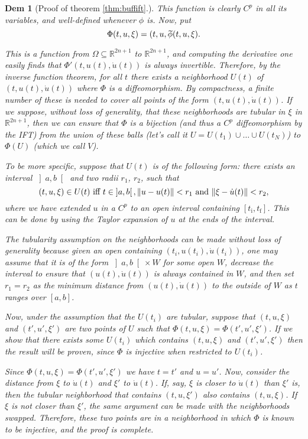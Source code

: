 \documentclass{article}
\theoremstyle{plain}
\theoremstyle{plain}
\theoremstyle{nonumberplain}
\theoremstyle{empty}
\newtheorem{proofref}{Dem}
\newcommand{\R}{\mathbb{R}}
\newcommand{\tstart}{\mathrm{i}}
\newcommand{\tend}{\mathrm{f}}
\newcommand{\wtphi}{
  \mspace{2mu}
  \widetilde{\mspace{-2mu}\smash[t]{\phi}}
}
\DeclarePairedDelimiter\norm{\lVert}{\rVert}
\begin{document}
\begin{appendices}
\begin{proofref}[Proof of theorem \ref{thm:buffift}.]
This function is clearly $C^p$ in all its variables, and well-defined whenever $\phi$ is. Now, put
\[\Phi(t,u,\xi) = (t, u, \wtphi(t,u,\xi).\]

This is a function from $\Omega \subseteq \R^{2n + 1}$ to $\R^{2n+1}$, and computing the derivative one easily finds that $\Phi'(t,u(t),\dot u(t))$ is always invertible. Therefore, by the inverse function theorem, for all $t$ there exists a neighborhood $U(t)$ of $(t,u(t), \dot u(t))$ where $\Phi$ is a diffeomorphism. By compactness, a finite number of these is needed to cover all points of the form $(t,u(t), \dot u(t))$. If we suppose, without loss of generality, that these neighborhoods are tubular in $\xi$ in $\R^{2n+1}$, then we can ensure that $\Phi$ is a bijection (and thus a $C^p$ diffeomorphism by the IFT) from the union of these balls (let's call it $U = U(t_1) \cup \dots \cup U(t_N)$) to $\Phi(U)$ (which we call $V$).

To be more specific, suppose that $U(t)$ is of the following form: there exists an interval $\left]a,b\right[$ and two radii $r_1$, $r_2$, such that
\[(t,u,\xi) \in U(t) \text{ iff } t \in \left]a,b\right[, \norm{u-u(t)} < r_1 \text{ and } \norm{\xi - \dot u(t)} < r_2,\]
where we have extended $u$ in a $C^p$ to an open interval containing $[t_\tstart, t_\tend]$. This can be done by using the Taylor expansion of $u$ at the ends of the interval.

The tubularity assumption on the neighborhoods can be made without loss of generality because given an open containing $(t_i, u(t_i), \dot u(t_i))$, one may assume that it is of the form $\left]a,b\right[ \times W$ for some open $W$, decrease the interval to ensure that $(u(t),\dot u(t))$ is always contained in $W$, and then set $r_1 = r_2$ as the minimum distance from $(u(t), \dot u(t))$ to the outside of $W$ as $t$ ranges over $[a,b]$.

Now, under the assumption that the $U(t_i)$ are tubular, suppose that $(t,u,\xi)$ and $(t', u', \xi')$ are two points of $U$ such that $\Phi(t,u,\xi) = \Phi(t', u', \xi')$. If we show that there exists some $U(t_i)$ which contains $(t,u,\xi)$ and $(t',u',\xi')$ then the result will be proven, since $\Phi$ is injective when restricted to $U(t_i)$.

Since $\Phi(t,u,\xi) = \Phi(t', u', \xi')$ we have $t = t'$ and $u = u'$. Now, consider the distance from $\xi$ to $\dot u(t)$ and $\xi'$ to $\dot u(t)$. If, say, $\xi$ is closer to $\dot u(t)$ than $\xi'$ is, then the tubular neighborhood that contains $(t,u,\xi')$ also contains $(t,u,\xi)$. If $\xi$ is not closer than $\xi'$, the same argument can be made with the neighborhoods swapped. Therefore, these two points are in a neighborhood in which $\Phi$ is known to be injective, and the proof is complete.
\end{proofref}

\end{appendices}



\end{document}

